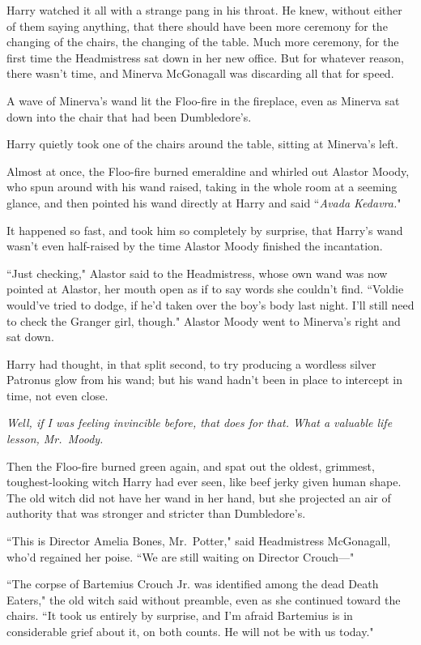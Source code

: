Harry watched it all with a strange pang in his throat. He knew, without either of them saying anything, that there should have been more ceremony for the changing of the chairs, the changing of the table. Much more ceremony, for the first time the Headmistress sat down in her new office. But for whatever reason, there wasn't time, and Minerva McGonagall was discarding all that for speed.

A wave of Minerva's wand lit the Floo-fire in the fireplace, even as Minerva sat down into the chair that had been Dumbledore's.

Harry quietly took one of the chairs around the table, sitting at Minerva's left.

Almost at once, the Floo-fire burned emeraldine and whirled out Alastor Moody, who spun around with his wand raised, taking in the whole room at a seeming glance, and then pointed his wand directly at Harry and said ``\emph{Avada Kedavra.}"

It happened so fast, and took him so completely by surprise, that Harry's wand wasn't even half-raised by the time Alastor Moody finished the incantation.

``Just checking," Alastor said to the Headmistress, whose own wand was now pointed at Alastor, her mouth open as if to say words she couldn't find. ``Voldie would've tried to dodge, if he'd taken over the boy's body last night. I'll still need to check the Granger girl, though." Alastor Moody went to Minerva's right and sat down.

Harry had thought, in that split second, to try producing a wordless silver Patronus glow from his wand; but his wand hadn't been in place to intercept in time, not even close.

\emph{Well, if I was feeling invincible before, that does for that. What a valuable life lesson, Mr.~Moody.}

Then the Floo-fire burned green again, and spat out the oldest, grimmest, toughest-looking witch Harry had ever seen, like beef jerky given human shape. The old witch did not have her wand in her hand, but she projected an air of authority that was stronger and stricter than Dumbledore's.

``This is Director Amelia Bones, Mr.~Potter," said Headmistress McGonagall, who'd regained her poise. ``We are still waiting on Director Crouch---"

``The corpse of Bartemius Crouch Jr. was identified among the dead Death Eaters," the old witch said without preamble, even as she continued toward the chairs. ``It took us entirely by surprise, and I'm afraid Bartemius is in considerable grief about it, on both counts. He will not be with us today."

